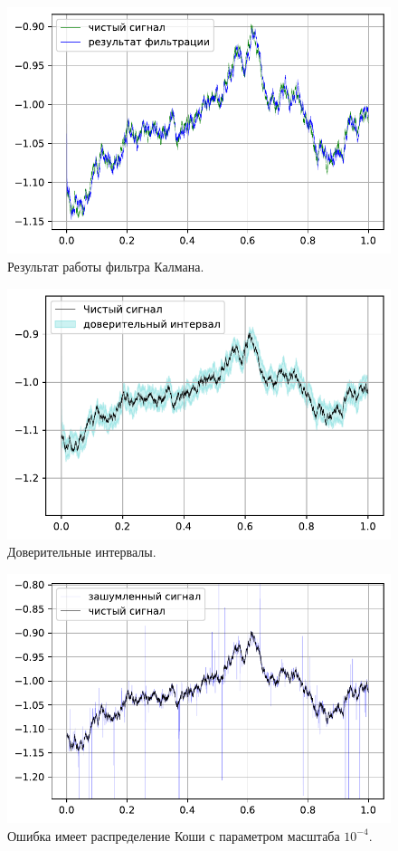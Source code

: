 \documentclass[16pt]{article}
\begin{document}
\begin{figure}
	\center
	\includegraphics[scale=0.7]{10_2.pdf}
	\caption{Результат работы фильтра Калмана.}
\end{figure}

\begin{figure}
	\center
	\includegraphics[scale=0.7]{10_3.pdf}
	\caption{Доверительные интервалы.}
\end{figure}

\begin{figure}
	\center
	\includegraphics[scale=0.7]{10_4.pdf}
	\caption{Ошибка имеет распределение Коши с параметром масштаба $10^{-4}$.}
\end{figure}
\end{document}
